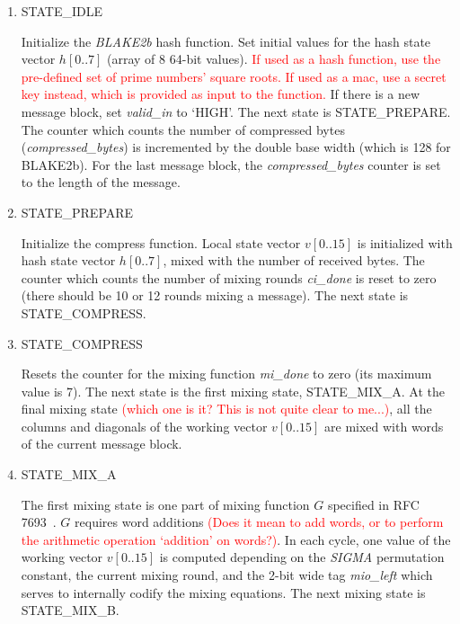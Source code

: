 \documentclass[%
	a4paper,
]
{article}
\newcommand{\todo}[1]{\textcolor{red}{#1}}
\begin{document}
\begin{enumerate}

	\item STATE_IDLE

		Initialize the \emph{BLAKE2b} hash function. Set initial values for the
		hash state vector $h[0..7]$ (array of 8 64-bit values). \todo{If used as a
		hash function, use the pre-defined set of prime numbers' square roots.
		If used as a \gls{mac}, use a secret key instead, which is provided as
		input to the function.}
%
		If there is a new message block, set \emph{valid\_in} to
		`HIGH'. The next state is \mbox{STATE_PREPARE}. The counter which counts the
		number of compressed bytes (\emph{compressed\_bytes}) is incremented by
		the double base width (which is 128 for BLAKE2b). For the last message block,
		the \emph{compressed\_bytes} counter is set to the length of the message.

	\item STATE_PREPARE

		Initialize the compress function. Local state vector $v[0..15]$ is initialized
		with hash state vector $h[0..7]$, mixed with the number of received bytes.
		The counter which counts the number of mixing rounds \emph{ci_done} is reset
		to zero (there should be 10 or 12 rounds mixing a message). The next state is
		\mbox{STATE_COMPRESS}.

	\item STATE_COMPRESS

		Resets the counter for the mixing	function \emph{mi_done} to zero (its
		maximum	value is 7). The next state is the first mixing state,
		\mbox{STATE_MIX_A}. At the final mixing state \todo{(which one is it? This
		is not quite clear to me...)},
		all the columns and diagonals of the working vector $v[0..15]$ are
		mixed with words of the current message block.

	\item STATE_MIX_A

		The first mixing state is one part of mixing function $G$ specified in
		RFC 7693~\autocite[7]{rfc7693}. $G$ requires word additions \todo{(Does
		it mean to add words, or to perform the arithmetic operation `addition' on
		words?)}. In each cycle, one value of the working vector $v[0..15]$
		is computed depending on the \emph{SIGMA} permutation constant, the current
		mixing round, and the  2-bit wide tag \emph{mio_left} which serves
		to internally codify the mixing equations. The next mixing state is
		\mbox{STATE_MIX_B}.


\end{enumerate}
\end{document}

